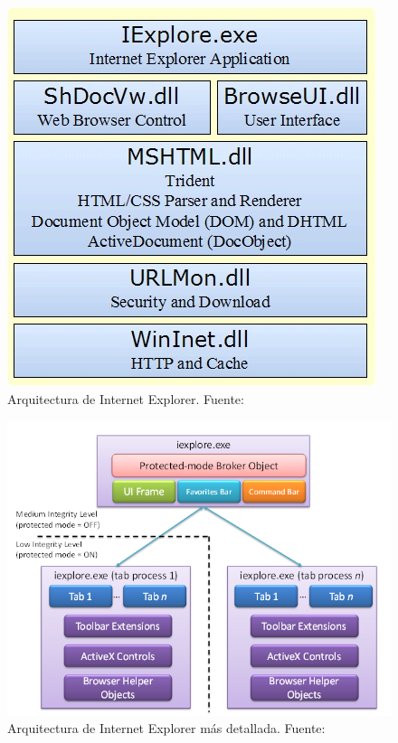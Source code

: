 	\begin{figure}[h!t]
	    \centering
		\includegraphics[scale=0.65]{figures/IEArch.jpg}
		\caption{Arquitectura de Internet Explorer. Fuente: \cite{IEArchImg}}
		\label{fig:archIE}
    \end{figure}

    \begin{figure}[h!t]
        \centering
        \includegraphics[scale=0.5]{figures/11_IE8andLooselyCoupledIELCIE_2.png}
        \caption{Arquitectura de Internet Explorer más detallada. Fuente: \cite{IE8LCIE}}
        \label{fig:archIE2}
    \end{figure}

